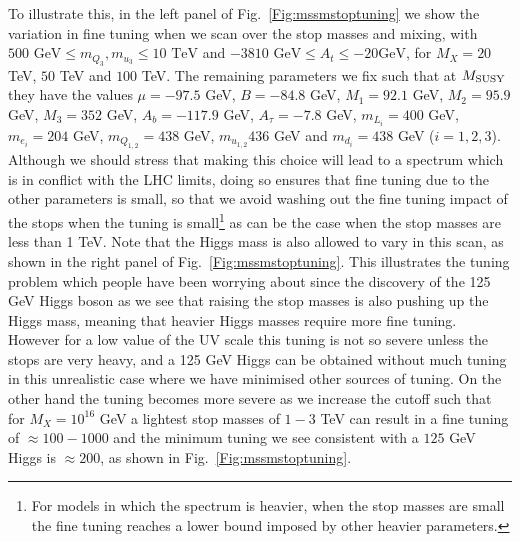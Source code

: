 \documentclass[preprint,amsmath,amssymb,aps,superscriptaddress,prd,showpacs,floatfix,nofootinbib]{revtex4-1}
\begin{document}
To illustrate this, in the left panel of Fig.~\ref{Fig:mssmstoptuning}
we show the variation in fine tuning when we scan over the stop masses
and mixing, with $500 \textrm{ GeV} \leq m_{Q_3},m_{u_3}\leq
10\textrm{ TeV}$ and $-3810\textrm{ GeV}\leq A_t\leq -20\textrm{
  GeV}$, for $M_X=20$ TeV, $50$ TeV and $100$ TeV.  The remaining
parameters we fix such that at $M_{\rm SUSY}$ they have the values
$\mu=-97.5$ GeV, $B=-84.8$ GeV, $M_1=92.1$ GeV, $M_2=95.9$ GeV,
$M_3=352$ GeV, $A_b=-117.9$ GeV, $A_\tau=-7.8$ GeV, $m_{L_i}=400$ GeV,
$m_{e_i}=204$ GeV, $m_{Q_{1,2}}=438$ GeV, $m_{u_{1,2}}436$ GeV and
$m_{d_i}=438$ GeV ($i=1,2,3$). Although we should stress that making
this choice will lead to a spectrum which is in conflict with the LHC
limits, doing so ensures that fine tuning due to the other parameters
is small, so that we avoid washing out the fine tuning impact of the
stops when the tuning is small\footnote{For models in which the
  spectrum is heavier, when the stop masses are small the fine tuning
  reaches a lower bound imposed by other heavier parameters.} as can
be the case when the stop masses are less than 1 TeV.  Note that the
Higgs mass is also allowed to vary in this scan, as shown in the right
panel of Fig.~\ref{Fig:mssmstoptuning}. This illustrates the tuning
problem which people have been worrying about since the discovery of
the 125 GeV Higgs boson as we see that raising the stop masses is also
pushing up the Higgs mass, meaning that heavier Higgs masses require
more fine tuning.  However for a low value of the UV scale this tuning
is not so severe unless the stops are very heavy, and a 125 GeV Higgs
can be obtained without much tuning in this unrealistic case where we
have minimised other sources of tuning.  On the other hand the tuning
becomes more severe as we increase the cutoff such that for $M_X =
10^{16}$ GeV a lightest stop masses of $1-3$ TeV can result in a fine
tuning of $\approx 100 - 1000$ and the minimum tuning we see consistent
with a $125$ GeV Higgs is $\approx 200$, as shown in
Fig.~\ref{Fig:mssmstoptuning}.

\end{document}
